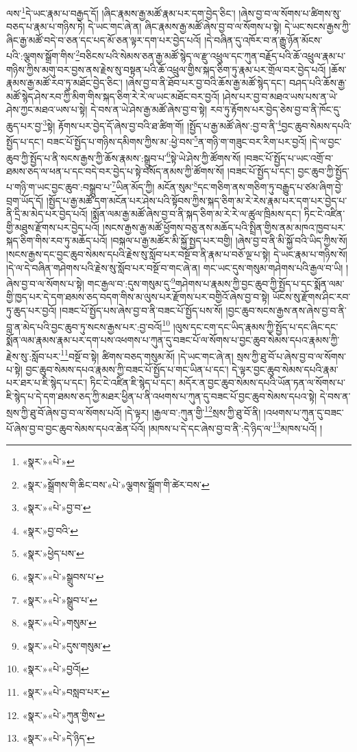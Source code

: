 ལས་\footnote{«སྣར་»«པེ་»}དེ་ཡང་རྣམ་པ་བརྒྱད་དོ། །ཞིང་རྣམས་རྒྱ་མཚོ་རྣམ་པར་དག་བྱེད་ཅིང་། །ཞེས་བྱ་བ་ལ་སོགས་པ་ཚིགས་སུ་བཅད་པ་རྣམ་པ་གཉིས་ཏེ། དེ་ཡང་གང་ཞེ་ན། ཞིང་རྣམས་རྒྱ་མཚོ་ཞེས་བྱ་བ་ལ་སོགས་པ་སྟེ། དེ་ཡང་སངས་རྒྱས་ཀྱི་ཞིང་རྒྱ་མཚོ་བདེ་བ་ཅན་དང་པད་མོ་ཅན་ལྟར་དག་པར་བྱེད་པའོ། །དེ་བཞིན་དུ་འཁོར་བ་ན་རྒྱུ་ཉོན་མོངས་པའི་:ལྕགས་སྒྲོག་གིས་\footnote{«སྣར་»སྒྲོགས་གི་ཆིང་བས་«པེ་»ལྕགས་སྒྲོག་གི་ཚེར་བས་}བཅིངས་པའི་སེམས་ཅན་རྒྱ་མཚོ་སྙེད་ལ་རྫུ་འཕྲུལ་དང་ཀུན་བརྗོད་པའི་ཆོ་འཕྲུལ་རྣམ་པ་གཉིས་ཀྱིས་མགུ་བར་བྱས་ནས་རྗེས་སུ་བསྟན་པའི་ཆོ་འཕྲུལ་གྱིས་སྐད་ཅིག་ཏུ་རྣམ་པར་གྲོལ་བར་བྱེད་པའོ། །ཆོས་རྣམས་རྒྱ་མཚོ་རབ་ཏུ་མཐོང་བྱེད་ཅིང་། །ཞེས་བྱ་བ་ནི་ཐོབ་པར་བྱ་བའི་ཆོས་རྒྱ་མཚོ་སྙེད་དང་། བཤད་པའི་ཆོས་རྒྱ་མཚོ་སྙེད་ཤེས་རབ་ཀྱི་མིག་གིས་སྐད་ཅིག་རེ་རེ་ལ་ཡང་མཐོང་བར་བྱའོ། །ཤེས་པར་བྱ་བ་མཐའ་ཡས་པས་ན་ཡེ་ཤེས་ཀྱང་མཐའ་ཡས་པ་སྟེ། དེ་བས་ན་ཡེ་ཤེས་རྒྱ་མཚོ་ཞེས་བྱ་བ་སྟེ། རབ་ཏུ་རྟོགས་པར་བྱེད་ཅེས་བྱ་བ་ནི་ཁོང་དུ་ཆུད་པར་བྱ་\footnote{«སྣར་»«པེ་»བྱ་བ་}སྟེ། རྟོགས་པར་བྱེད་དོ་ཞེས་བྱ་བའི་ཐ་ཚིག་གོ། །སྤྱོད་པ་རྒྱ་མཚོ་ཞེས་:བྱ་བ་ནི་\footnote{«སྣར་»བྱ་བའི་}བྱང་ཆུབ་སེམས་དཔའི་སྤྱོད་པ་དང་། བཟང་པོ་སྤྱོད་པ་གཉིས་དམིགས་ཀྱིས་མ་:ཕྱེ་བས་\footnote{«སྣར་»ཕྱེད་པས་}ན་གཉི་ག་གཟུང་བར་རིག་པར་བྱའོ། །དེ་ལ་བྱང་ཆུབ་ཀྱི་སྤྱོད་པ་ནི་སངས་རྒྱས་ཀྱི་ཆོས་རྣམས་:སྒྲུབ་པ་\footnote{«སྣར་»«པེ་»སྒྲུབས་པ་}སྟེ་ཡེ་ཤེས་ཀྱི་ཚོགས་སོ། །བཟང་པོ་སྤྱོད་པ་ཡང་འགྲོ་བ་ཐམས་ཅད་ལ་ཕན་པ་དང་བདེ་བར་བྱེད་པ་སྟེ་བསོད་ནམས་ཀྱི་ཚོགས་སོ། །བཟང་པོ་སྤྱོད་པ་དང་། བྱང་ཆུབ་ཀྱི་སྤྱོད་པ་གཉི་ག་ཡང་བྱང་ཆུབ་:བསྒྲུབ་པ་\footnote{«སྣར་»«པེ་»སྒྲུབ་པ་}ཡིན་མོད་ཀྱི། མངོན་སུམ་\footnote{«སྣར་»«པེ་»གསུམ་}དང་གཅིག་ནས་གཅིག་ཏུ་བརྒྱུད་པ་ཙམ་ཞིག་བྱེ་བྲག་ཡོད་དོ། །སྤྱོད་པ་རྒྱ་མཚོ་དག་མངོན་པར་ཤེས་པའི་སྟོབས་ཀྱིས་སྐད་ཅིག་མ་རེ་རེས་རྣམ་པར་དག་པར་བྱེད་པ་ནི་དྲི་མ་མེད་པར་བྱེད་པའོ། །སྨོན་ལམ་རྒྱ་མཚོ་ཞེས་བྱ་བ་ནི་སྐད་ཅིག་མ་རེ་རེ་ལ་ཚུལ་ཁྲིམས་དང་། ཏིང་ངེ་འཛིན་གྱི་མཐུས་རྫོགས་པར་བྱེད་པའོ། །སངས་རྒྱས་རྒྱ་མཚོ་ཕྱོགས་བཅུ་ནས་མཆོད་པའི་སྤྲིན་གྱིས་ནམ་མཁའ་ཁྱབ་པར་སྐད་ཅིག་གིས་རབ་ཏུ་མཆོད་པའོ། །བསྐལ་པ་རྒྱ་མཚོར་མི་སྐྱོ་སྤྱད་པར་བགྱི། །ཞེས་བྱ་བ་ནི་མི་སྐྱོ་བའི་ཡིད་ཀྱིས་སོ། །སངས་རྒྱས་དང་བྱང་ཆུབ་སེམས་དཔའི་རྗེས་སུ་སློབ་པར་བསྔོ་བ་ནི་རྣམ་པ་བཅོ་ལྔ་པ་སྟེ། དེ་ཡང་རྣམ་པ་གཉིས་སོ། །དེ་ལ་དེ་བཞིན་གཤེགས་པའི་རྗེས་སུ་སློབ་པར་བསྔོ་བ་གང་ཞེ་ན། གང་ཡང་དུས་གསུམ་གཤེགས་པའི་རྒྱལ་བ་ཡི། །ཞེས་བྱ་བ་ལ་སོགས་པ་སྟེ། གང་རྒྱལ་བ་:དུས་གསུམ་དུ་\footnote{«སྣར་»«པེ་»དུས་གསུམ་}གཤེགས་པ་རྣམས་ཀྱི་བྱང་ཆུབ་ཀྱི་སྤྱོད་པ་དང་སྨོན་ལམ་གྱི་ཁྱད་པར་དེ་དག་ཐམས་ཅད་བདག་གིས་མ་ལུས་པར་རྫོགས་པར་བགྱིའོ་ཞེས་བྱ་བ་སྟེ། ཡོངས་སུ་རྫོགས་ཤིང་རབ་ཏུ་ཆུད་པར་བྱའོ། །བཟང་པོ་སྤྱོད་པས་ཞེས་བྱ་བ་ནི་བཟང་པོ་སྤྱོད་པས་སོ། །བྱང་ཆུབ་སངས་རྒྱས་ནས་ཞེས་བྱ་བ་ནི་བླ་ན་མེད་པའི་བྱང་ཆུབ་ཏུ་སངས་རྒྱས་པར་:བྱ་བའོ།\footnote{«སྣར་»«པེ་»བྱའོ།} །ལུས་དང་ངག་དང་ཡིད་རྣམས་ཀྱི་སྤྱོད་པ་དང་ཞིང་དང་སྨོན་ལམ་རྣམས་རྣམ་པར་དག་པས་འཕགས་པ་ཀུན་དུ་བཟང་པོ་ལ་སོགས་པ་བྱང་ཆུབ་སེམས་དཔའ་རྣམས་ཀྱི་རྗེས་སུ་:སློབ་པར་\footnote{«སྣར་»«པེ་»བསླབ་པར་}བསྔོ་བ་སྟེ། ཚིགས་བཅད་གསུམ་མོ། །དེ་ཡང་གང་ཞེ་ན། སྲས་ཀྱི་ཐུ་བོ་པ་ཞེས་བྱ་བ་ལ་སོགས་པ་སྟེ། བྱང་ཆུབ་སེམས་དཔའ་རྣམས་ཀྱི་བཟང་པོ་སྤྱོད་པ་གང་ཡིན་པ་དང་། དེ་ལྟར་བྱང་ཆུབ་སེམས་དཔའི་རྣམ་པར་ཐར་པ་ཇི་སྙེད་པ་དང་། ཏིང་ངེ་འཛིན་ཇི་སྙེད་པ་དང་། མདོར་ན་བྱང་ཆུབ་སེམས་དཔའི་ཡོན་ཏན་ལ་སོགས་པ་ཇི་སྙེད་པ་དེ་དག་ཐམས་ཅད་ཀྱི་མཐར་ཕྱིན་པ་ནི་འཕགས་པ་ཀུན་དུ་བཟང་པོ་བྱང་ཆུབ་སེམས་དཔའ་སྟེ། དེ་བས་ན་སྲས་ཀྱི་ཐུ་བོ་ཞེས་བྱ་བ་ལ་སོགས་པའོ། །དེ་ལྟར། །རྒྱལ་བ་:ཀུན་གྱི་\footnote{«སྣར་»«པེ་»ཀུན་གྱིས་}སྲས་ཀྱི་ཐུ་བོ་ནི། །འཕགས་པ་ཀུན་དུ་བཟང་པོ་ཞེས་བྱ་བ་བྱང་ཆུབ་སེམས་དཔའ་ཆེན་པོའོ། །མཁས་པ་དེ་དང་ཞེས་བྱ་བ་ནི་:དེ་ཉིད་ལ་\footnote{«སྣར་»«པེ་»དེ་ཉིད་}མཁས་པའོ། །
